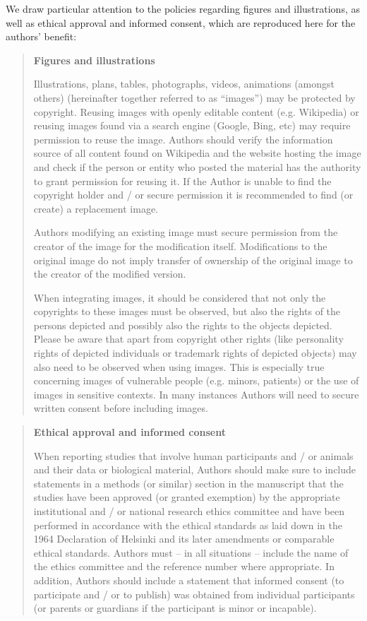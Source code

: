 \documentclass[runningheads]{llncs}
\begin{document}
We draw particular attention to the policies regarding figures and illustrations, as well as ethical approval and informed consent, which are reproduced here for the authors' benefit:
\begin{quotation}
  \noindent\textbf{Figures and illustrations}
  \smallskip

  Illustrations, plans, tables, photographs, videos, animations (amongst others) (hereinafter together referred to as “images”) may be protected by copyright. 
  Reusing images with openly editable content (e.g. Wikipedia) or reusing images found via a search engine (Google, Bing, etc) may require permission to reuse the image. 
  Authors should verify the information source of all content found on Wikipedia and the website hosting the image and check if the person or entity who posted the material has the authority to grant permission for reusing it.  
  If the Author is unable to find the copyright holder and / or secure permission it is recommended to find (or create) a replacement image.

  Authors modifying an existing image must secure permission from the creator of the image for the modification itself. 
  Modifications to the original image do not imply transfer of ownership of the original image to the creator of the modified version.

  When integrating images, it should be considered that not only the copyrights to these images must be observed, but also the rights of the persons depicted and possibly also the rights to the objects depicted. 
  Please be aware that apart from copyright other rights (like personality rights of depicted individuals or trademark rights of depicted objects) may also need to be observed when using images. 
  This is especially true concerning images of vulnerable people (e.g. minors, patients) or the use of images in sensitive contexts. 
  In many instances Authors will need to secure written consent before including images.
\end{quotation}

\begin{quotation}
  \noindent\textbf{Ethical approval and informed consent}
  \smallskip

  When reporting studies that involve human participants and / or animals and their data or biological material, Authors should make sure to include statements in a methods (or similar) section in the manuscript that the studies have been approved (or granted exemption) by the appropriate institutional and / or national research ethics committee and have been performed in accordance with the ethical standards as laid down in the 1964 Declaration of Helsinki and its later amendments or comparable ethical standards. 
  Authors must -- in all situations -- include the name of the ethics committee and the reference number where appropriate. 
  In addition, Authors should include a statement that informed consent (to participate and / or to publish) was obtained from individual participants (or parents or guardians if the participant is minor or incapable).
\end{quotation}
\end{document}
